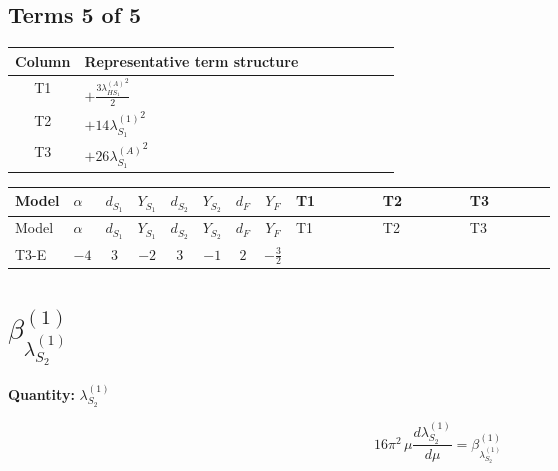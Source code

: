 \documentclass[8pt]{article}
\begin{document}
\begin{landscape}
\subsection*{Terms 5 of 5}
\begin{center}
\begin{tabular}{@{}c >{\raggedright\arraybackslash}p{0.82\linewidth}@{}}
\toprule
Column & Representative term structure \\
\midrule
T1 & \(\displaystyle +\frac{3 {\lambda_{HS_1}^{(A)}}^2}{2}\) \\
\midrule
T2 & \(\displaystyle +14 {\lambda_{S_1}^{(1)}}^2\) \\
\midrule
T3 & \(\displaystyle +26 {\lambda_{S_1}^{(A)}}^2\) \\
\midrule
\bottomrule
\end{tabular}
\end{center}
\smallskip
\tiny
\begin{longtable}{@{}llcccccc >{\raggedright\arraybackslash}p{0.21\linewidth} >{\raggedright\arraybackslash}p{0.21\linewidth} >{\raggedright\arraybackslash}p{0.21\linewidth}@{}}
\toprule
Model & $\alpha$ & $d_{S_1}$ & $Y_{S_1}$ & $d_{S_2}$ & $Y_{S_2}$ & $d_F$ & $Y_F$ & T1 & T2 & T3 \\
\midrule
\endfirsthead
\toprule
Model & $\alpha$ & $d_{S_1}$ & $Y_{S_1}$ & $d_{S_2}$ & $Y_{S_2}$ & $d_F$ & $Y_F$ & T1 & T2 & T3 \\
\midrule
\endhead
T3-E & $-4$ & $3$ & $-2$ & $3$ & $-1$ & $2$ & $-\frac{3}{2}$ & \scriptsize\adjustbox{max width=\linewidth}{$\begin{gathered} +\frac{3 {\lambda_{HS_1}^{(A)}}^2}{2}\end{gathered}$} & \scriptsize\adjustbox{max width=\linewidth}{$\begin{gathered} +14 {\lambda_{S_1}^{(1)}}^2\end{gathered}$} & \scriptsize\adjustbox{max width=\linewidth}{$\begin{gathered} +26 {\lambda_{S_1}^{(A)}}^2\end{gathered}$} \\
\midrule
\bottomrule
\end{longtable}
\clearpage
\section*{$\beta_{\lambda_{S_2}^{(1)}}^{(1)}$}
\noindent\textbf{Quantity: }$\lambda_{S_2}^{(1)}$\par\smallskip
\[16\pi^2\,\mu\frac{d \lambda_{S_2}^{(1)}}{d\mu}=\beta_{\lambda_{S_2}^{(1)}}^{(1)}\]

\end{landscape}
\end{document}
